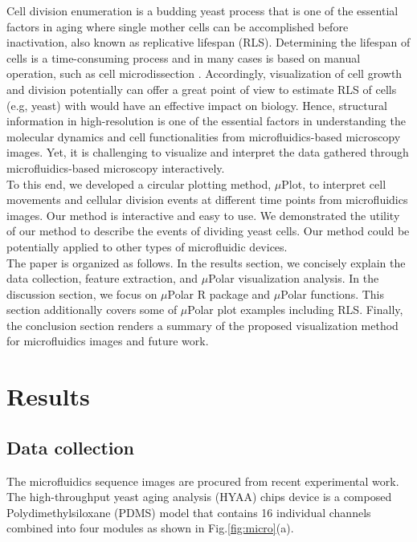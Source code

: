 \documentclass[conference]{IEEEtran}
\begin{document}
Cell division enumeration is a budding yeast process that is one of the essential factors in aging where single mother cells can be accomplished before inactivation, also known as replicative lifespan (RLS). Determining the lifespan of cells is a time-consuming process and in many cases is based on manual operation, such as cell microdissection \cite{ref08}. Accordingly, visualization of cell growth and division potentially can offer a great point of view to estimate RLS of cells (e.g, yeast) with would have an effective impact on biology. Hence, structural information in high-resolution is one of the essential factors in understanding the molecular dynamics and cell functionalities from microfluidics-based microscopy images. Yet, it is challenging to visualize and interpret the data gathered through microfluidics-based microscopy interactively.\\

To this end, we developed a circular plotting method, $\mu$Plot, to interpret cell movements and cellular division events at different time points from microfluidics images. Our method is interactive and easy to use. We demonstrated the utility of our method to describe the events of dividing yeast cells. Our method could be potentially applied to other types of microfluidic devices.\\

The paper is organized as follows. In the results section, we concisely explain the data collection, feature extraction, and $\mu$Polar visualization analysis. In the discussion section, we focus on $\mu$Polar R package and $\mu$Polar functions. This section additionally covers some of $\mu$Polar plot examples including RLS. Finally, the conclusion section renders a summary of the proposed visualization method for microfluidics images and future work.

 

\section{Results}

\subsection*{Data collection}
The microfluidics sequence images are procured from \cite{ref13} recent experimental work. The high-throughput yeast aging analysis (HYAA) chips device is a composed Polydimethylsiloxane (PDMS) model that contains 16 individual channels combined into four modules as shown in Fig.\ref{fig:micro}(a).
\end{document}
